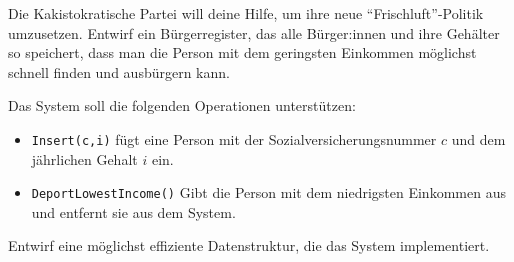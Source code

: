 \documentclass{uebung_cs}
\begin{document}
\begin{aufgabe}%
	Die Kakistokratische Partei will deine Hilfe, um ihre neue \enquote{Frischluft}-Politik umzusetzen.
	Entwirf ein Bürgerregister, das alle Bürger:innen und ihre Gehälter so speichert, dass man die Person mit dem geringsten Einkommen möglichst schnell finden und ausbürgern kann.

	Das System soll die folgenden Operationen unterstützen:
	\begin{itemize}
		\item \texttt{Insert(c,i)} fügt eine Person mit der Sozialversicherungsnummer $c$ und dem jährlichen Gehalt $i$ ein.
		\item \texttt{DeportLowestIncome()} Gibt die Person mit dem niedrigsten Einkommen aus und entfernt sie aus dem System.
	\end{itemize}
	Entwirf eine möglichst effiziente Datenstruktur, die das System implementiert.
\end{aufgabe}
\end{document}
